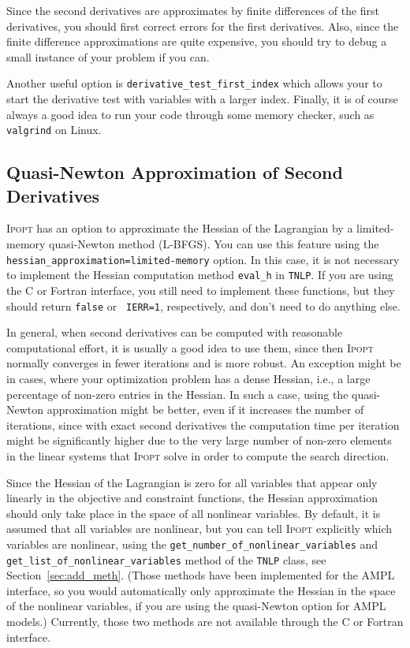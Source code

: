 \documentclass[10pt]{article}
\newcommand{\Ipopt}{\textsc{Ipopt}\xspace}
\begin{document}
Since the second derivatives are approximates by finite differences of
the first derivatives, you should first correct errors for the first
derivatives.  Also, since the finite difference approximations are
quite expensive, you should try to debug a small instance of your
problem if you can.  

Another useful option is \texttt{derivative\_test\_first\_index} which
allows your to start the derivative test with variables with a larger
index.
%
Finally, it is of course always a good idea to run your code through
some memory checker, such as {\tt valgrind} on Linux.

\subsection{Quasi-Newton Approximation of Second Derivatives}
\label{sec:quasiNewton}

\Ipopt has an option to approximate the Hessian of the Lagrangian by
a limited-memory quasi-Newton method (L-BFGS).  You can use this
feature using the {\tt hessian\_approximation=limited-memory} option.  In this case, it is not necessary to
implement the Hessian computation method {\tt eval\_h} in {\tt TNLP}.
If you are using the C or Fortran interface, you still need to
implement these functions, but they should return {\tt false} or {\tt
  IERR=1}, respectively, and don't need to do anything else.

In general, when second derivatives can be computed with reasonable
computational effort, it is usually a good idea to use them, since
then \Ipopt normally converges in fewer iterations and is more
robust.  An exception might be in cases, where your optimization
problem has a dense Hessian, i.e., a large percentage of non-zero entries
in the Hessian. In such a case, using the quasi-Newton approximation might be
better, even if it increases the number of iterations, since with exact
second derivatives the computation time per iteration might be significantly 
higher due to the very large number of non-zero elements in the linear systems 
that \Ipopt solve in order to compute the search direction.

Since the Hessian of the Lagrangian is zero for all variables that
appear only linearly in the objective and constraint functions, the
Hessian approximation should only take place in the space of all
nonlinear variables.  By default, it is assumed that all variables are
nonlinear, but you can tell \Ipopt explicitly which variables are
nonlinear, using the {\tt get\_number\_of\_nonlinear\_variables} and
{\tt get\_list\_of\_nonlinear\_variables} method of the {\tt TNLP}
class, see Section~\ref{sec:add_meth}.  (Those methods have been
implemented for the AMPL interface, so you would automatically only
approximate the Hessian in the space of the nonlinear variables, if
you are using the quasi-Newton option for AMPL models.)  Currently,
those two methods are not available through the C or Fortran
interface.
\end{document}
